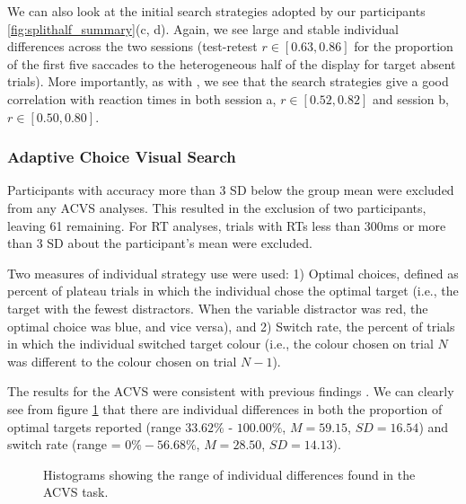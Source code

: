 \documentclass[]{rsos}%
\begin{document}
We can also look at the initial search strategies adopted by our participants \ref{fig:splithalf_summary}(c, d). Again, we see large and stable individual differences across the two sessions (test-retest $r \in [0.63, 0.86]$ for the proportion of the first five saccades to the heterogeneous half of the display for target absent trials). More importantly, as with \cite{nowakowska2017}, we see that the search strategies give a good correlation with reaction times in both session a, $r \in [0.52, 0.82]$ and session b, $r \in [0.50, 0.80]$.


\subsubsection{Adaptive Choice Visual Search}
 
Participants with accuracy more than 3 SD below the group mean were excluded from any ACVS analyses. This resulted in the exclusion of two participants, leaving 61 remaining. For RT analyses, trials with RTs less than 300ms or more than 3 SD about the participant's mean were excluded.
 
Two measures of individual strategy use were used: 1) Optimal choices, defined as percent of plateau trials in which the individual chose the optimal target (i.e., the target with the fewest distractors. When the variable distractor was red, the optimal choice was blue, and vice versa), and 2) Switch rate, the percent of trials in which the individual switched target colour (i.e., the colour chosen on trial $N$ was different to the colour chosen on trial $N-1$). 
  
The results for the ACVS were consistent with previous findings \cite{irons-leber2016,irons-leber2018}. We can clearly see from figure \ref{fig:acvs_summary} that there are individual differences in both the proportion of optimal targets reported (range $33.62\%$ - $100.00\%$, $M = 59.15$, $SD = 16.54$) and switch rate (range = $0\% - 56.68\%$, $M = 28.50$, $SD = 14.13$).

\begin{figure}
\centering
{}
\caption{Histograms showing the range of individual differences found in the ACVS task.}
\label{fig:acvs_summary}
\end{figure}
\end{document}
